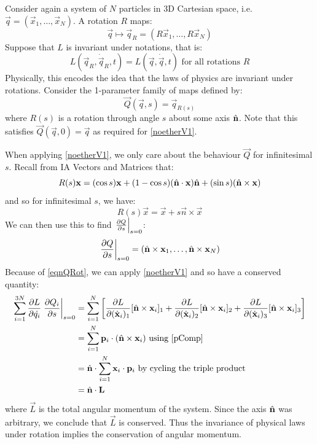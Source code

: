 \documentclass[../main.tex]{subfiles}
\begin{document}
\begin{example}
  Consider again a system of $N$ particles in 3D Cartesian space, i.e. $\vec{q} = (\vec{x}_1, \ldots, \vec{x}_N)$.
  A rotation $R$ maps:
  \[
    \vec{q} \mapsto \vec{q}_{R} = (R\vec{x}_1, \ldots, R\vec{x}_N)
  \]
  Suppose that $L$ is invariant under notations, that is:
  \[
    L(\vec{q}_R, \dot{\vec{q}}_R, t) = L(\vec{q}, \dot{\vec{q}}, t) \text{ for all rotations $R$}
  \]
  Physically, this encodes the idea that the laws of physics are invariant under rotations.
  Consider the 1-parameter family of maps defined by:
  \begin{equation}
    \vec{Q}(\vec{q}, s) = \vec{q}_{R(s)} \tag{$\dag$} \label{eqnQRot}
  \end{equation}
  where $R(s)$ is a rotation through angle $s$ about some axis $\hat{\mathbf{\bm{n}}}$.
  Note that this satisfies $\vec{Q}(\vec{q}, 0) = \vec{q}$ as required for \cref{noetherV1}.

  When applying \cref{noetherV1}, we only care about the behaviour $\vec{Q}$ for infinitesimal $s$.
  Recall from IA Vectors and Matrices that:
  \[
    R(s)\mathbf{\bm{x}} = (\cos s)\mathbf{\bm{x}} + (1 - \cos s)(\hat{\mathbf{\bm{n}}} \cdot \mathbf{\bm{x}})\hat{\mathbf{\bm{n}}} + (\sin s)(\hat{\mathbf{\bm{n}}} \times \mathbf{\bm{x}})
  \]
  and so for infinitesimal $s$, we have:
  \[
    R(s)\vec{x} = \vec{x} + s \vec{n} \times \vec{x}
  \]
  We can then use this to find $\at{\pderiv{Q}{s}}{s = 0}$:
  \[
    \at{\pderiv{Q}{s}}{s = 0} = (\uvec{n} \times \vec{x}_1, \ldots, \uvec{n} \times \vec{x}_N)
  \]
  Because of \cref{eqnQRot}, we can apply \cref{noetherV1} and so have a conserved quantity:
  \begin{align*}
    \sum_{i = 1}^{3N} \pderiv{L}{\dot{q_i}} \at{\pderiv{Q_i}{s}}{s = 0} &= \sum_{i = 1}^{N} \left[\pderiv{L}{(\dot{\vec{x}}_i)_1} [\uvec{n} \times \vec{x}_i]_1 + \pderiv{L}{(\dot{\vec{x}}_i)_2} [\uvec{n} \times \vec{x}_i]_2 + \pderiv{L}{(\dot{\vec{x}}_i)_3} [\uvec{n} \times \vec{x}_i]_3\right] \\
                                                                        &= \sum_{i = 1}^{N} \vec{p}_i \cdot (\uvec{n} \times \vec{x}_i) \text{ using \cref{pComp}} \\
                                                                        &= \uvec{n} \cdot \sum_{i = 1}^{N} \vec{x}_i \cdot \vec{p}_i \text{ by cycling the triple product} \\
                                                                        &= \uvec{n} \cdot \vec{L}
  \end{align*}
  where $\vec{L}$ is the total angular momentum of the system.
  Since the axis $\hat{\mathbf{\bm{n}}}$ was arbitrary, we conclude that $\vec{L}$ is conserved.
  Thus the invariance of physical laws under rotation implies the conservation of angular momentum.
\end{example}
\end{document}
